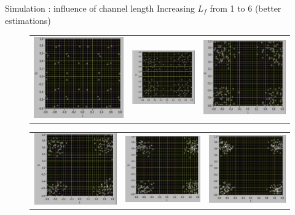 \documentclass{beamer}
\begin{document}
\begin{frame}{Simulation : influence of channel length}
    Increasing $L_f$ from 1 to 6 (better estimations)
    \begin{figure}[h]
        \centering
        \begin{tabular}{ccc}
            \includegraphics[width= 0.3 \textwidth]{eq1.png} & \includegraphics[width= 0.3 \textwidth]{eq2.png} & \includegraphics[width= 0.3 \textwidth]{eq3.png} \\
        \end{tabular}
    \end{figure}
    \begin{figure}[h]
        \centering
        \begin{tabular}{ccc}
            \includegraphics[width= 0.3 \textwidth]{eq4.png} & \includegraphics[width= 0.3 \textwidth]{eq5.png} & \includegraphics[width= 0.3 \textwidth]{eq6.png} \\

\end{tabular}
\end{figure}
\end{frame}
\end{document}
